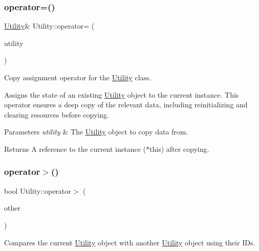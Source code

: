 \subsubsection{\texorpdfstring{operator=()}{operator=()}}
{\footnotesize\ttfamily \mbox{\hyperlink{classUtility}{Utility}}\& Utility\+::operator= (\begin{DoxyParamCaption}\item[{const \mbox{\hyperlink{classUtility}{Utility}} \&}]{utility }\end{DoxyParamCaption})}



Copy assignment operator for the \mbox{\hyperlink{classUtility}{Utility}} class. 

Assigns the state of an existing \mbox{\hyperlink{classUtility}{Utility}} object to the current instance. This operator ensures a deep copy of the relevant data, including reinitializing and clearing resources before copying.


\begin{DoxyParams}{Parameters}
{\em utility} & The \mbox{\hyperlink{classUtility}{Utility}} object to copy data from.\\
\hline
\end{DoxyParams}
\begin{DoxyReturn}{Returns}
A reference to the current instance ($\ast$this) after copying. 
\end{DoxyReturn}
\mbox{\label{classUtility_a222897e8c338fde0d754df4683fbc89b}} 
\subsubsection{\texorpdfstring{operator$>$()}{operator>()}}
{\footnotesize\ttfamily bool Utility\+::operator$>$ (\begin{DoxyParamCaption}\item[{const \mbox{\hyperlink{classUtility}{Utility}} $\ast$}]{other }\end{DoxyParamCaption})}



Compares the current \mbox{\hyperlink{classUtility}{Utility}} object with another \mbox{\hyperlink{classUtility}{Utility}} object using their I\+Ds. 


